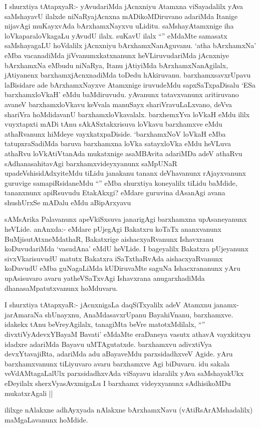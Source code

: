 \begin{artha}
I shurxtiya tAtapxyaR:- yAvudariMda jAcnxniyu Atamxna viSayadalilx yAva saMshayavU ilalxde niNaRyajAcnxna mADikoMDiruvano adariMda Itanige nijavAgi muKayxvAda bArxhamxNayxvu uLiditu. saMshayAtamxnige iha loVkaparaloVkagaLu yAvudU ilalx. suKavU ilalx ``\stext'' eMdaMte samasatx saMshayagaLU hoVdalilx jAcnxniyu bArxhamxNanAguvanu. `atha bArxhamxNa' eMba vacanadiMda jiVvanumxkatxnanunx heVLiruvudariMda jAcnxniye bArxhamxNa eMbudu niNaRya, Itanu jAtiyiMda bArxhamxNanAgilalx, jAtiyanenx barxhamxjAcnxnadiMda toDedu hAkiruvanu. barxhamxsavxrUpavu laBisidare ade bArxhamxNayxve Atamxnige iruvudeMdu sapxSaTxpaDisalu `ESa barxhamxloVkaH' eMdu baMdiruvudu. yAvanunx tatavxvanunx aritiruvano avaneV barxhamxloVkavu keVvala manuSayx shariVravuLaLxvano, deVva shariVra hoMdidavanU barxhamxloVkavalalx. barxhemxYva loVkaH eMdu ililx vuyxtapxti mADi tAnu sAkASxtakxrisuva loVkavu barxhamxve eMdu athaRvanunx hiMdeye vayxkatxpaDiside. `barxhamxNoV loVkaH eMba tatupxraSadiMda baruva barxhamxna loVka satayxloVka eMdu heVLuva athaRvu loVkAtiVtanAda mukatxnige asaMBAvita adariMDa adeV athaRvu sAdhanasahitavAgi barxhamxvideyxyanunx saMpUNaR upadeVshisidAdxyiteMdu tiLidu janakanu tananx deVhavanunx rAjayxvanunx guruvige samapiRsidaneMdu ``\stext'' eMba shurxtiya koneyalilx tiLidu baMdide, tananxnunx apiRsuvudu EtakAkxgi? eMdare guruvina dAsanAgi avana shushUrxSe mADalu eMdu aBipArxyavu
\end{artha}

\begin{artha}
sAMsArika Palavanunx apeVkiSxsuva janarigAgi barxhamxna upAsaneyanunx heVLide. anAnxda:- eMdare pUjegAgi Bakatxru koTaTx ananxvanunx BuMjisutAtxneMdathaR, Bakatxrige aishacxyaRvanunx Ishavxranu koDuvudariMda `vasudAna' eMdU heVLide. I bageyalilx Bakatxra pUjeyanunx sivxVkarisuvudU matutx Bakatxra iSaTxthaRvAda aishacxyaRvanunx koDuvudU eMba guNagaLiMda kUDiruvaMte saguNa Ishacxrananunx yAru upAsisuvaro avaru yatheVSaTxvAgi Ishavxrana anugarxhadiMda dhanasaMpatutxvanunx hoMduvaru. 
\end{artha}

\begin{artha}
I shurxtiya tAtapxyaR:- jAcnxnigaLa daqSiTxyalilx adeV Atamxnu janamx-jarAmaraNa shUnayxnu, AnaMdasavxrUpanu BayahiVnanu, barxhamxve. idakekx tAnu beVreyAgilalx, tanagiMta beVre matotxMdilalx, ``\stext'' divxtiVyAdevxYBayaM Bavati' eMdaMte eraDaneya vasutx athavA vayxkitxyu idadxre adariMda Bayavu uMTAgutatxde. barxhamxvu adivxtiVya devxYtavajiRta, adariMda adu aBayaveMdu parxsidadhxveV Agide. yAru barxhamxvanunx tiLiyuvaro avaru barxhamxve Agi biDuvaru. idu sakala veVdAMtagaLalUlx parxsidadhxvAda viSayavu idaralilx yAva saMshayakUkx eDeyilalx sherxVyasAvxmigaLu I barxhamx videyxyanunx sAdhisikoMDu mukatxrAgali ||
\end{artha}
ililxge nAlakxne adhAyxyada nAlakxne bArxhamxNavu (vAtiRsArAMshadalilx) maMgaLavanunx hoMdide.

